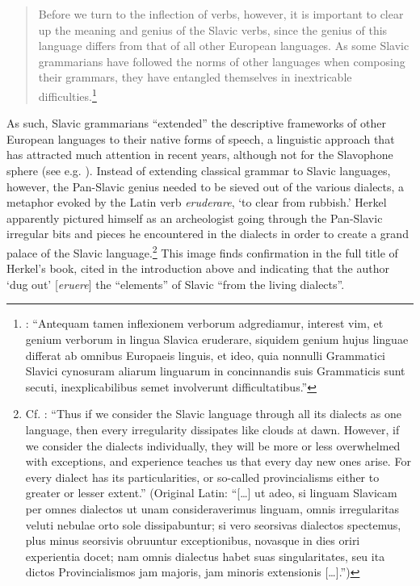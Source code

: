 \begin{quote}
    Before we turn to the inflection of verbs, however, it is important to clear up the meaning and genius of the Slavic verbs, since the genius of this language differs from that of all other European languages. As some Slavic grammarians have followed the norms of other languages when composing their grammars, they have entangled themselves in inextricable difficulties.\footnote{\citet[103--104]{herkel_elementa_1826}: “Antequam tamen inflexionem verborum adgrediamur, interest vim, et genium verborum in lingua Slavica eruderare, siquidem genium hujus linguae differat ab omnibus Europaeis linguis, et ideo, quia nonnulli Grammatici Slavici cynosuram aliarum linguarum in concinnandis suis Grammaticis sunt secuti, inexplicabilibus semet involverunt difficultatibus.”}
\end{quote}

\noindent As such, Slavic grammarians “extended” the descriptive frameworks of other European languages to their native forms of speech, a linguistic approach that has attracted much attention in recent years, although not for the Slavophone sphere (see e.g. \cite{aussant_grammaire_2021}). Instead of extending classical grammar to Slavic languages, however, the Pan-Slavic genius needed to be sieved out of the various dialects, a metaphor evoked by the Latin verb \textit{eruderare}, ‘to clear from rubbish.’ Herkel apparently pictured himself as an archeologist going through the Pan-Slavic irregular bits and pieces he encountered in the dialects in order to create a grand palace of the Slavic language.\footnote{Cf. \citet[150]{herkel_elementa_1826}: “Thus if we consider the Slavic language through all its dialects as one language, then every irregularity dissipates like clouds at dawn. However, if we consider the dialects individually, they will be more or less overwhelmed with exceptions, and experience teaches us that every day new ones arise. For every dialect has its particularities, or so-called provincialisms either to greater or lesser extent.” (Original Latin: “[…] ut adeo, si linguam Slavicam per omnes dialectos ut unam consideraverimus linguam, omnis irregularitas veluti nebulae orto sole dissipabuntur; si vero seorsivas dialectos spectemus, plus minus seorsivis obruuntur exceptionibus, novasque in dies oriri experientia docet; nam omnis dialectus habet suas singularitates, seu ita dictos Provincialismos jam majoris, jam minoris extensionis […].”)} This image finds confirmation in the full title of Herkel’s book, cited in the introduction above and indicating that the author ‘dug out’ [\textit{eruere}] the “elements” of Slavic “from the living dialects”.

